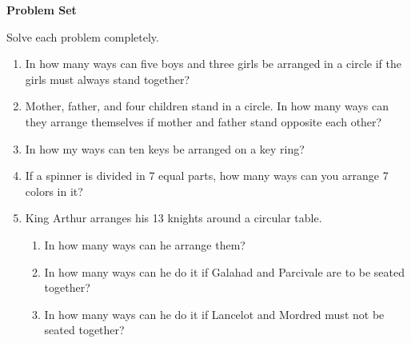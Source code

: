 \textbf{Problem Set}

\vspce

Solve each problem completely. 

\begin{enumerate}[label = \arabic*. ]
\item In how many ways can five boys and three girls be arranged in a circle if the girls must always stand together?

\item Mother, father, and four children stand in a circle. In how many ways can they arrange themselves if mother and father stand opposite each other?
\item In how my ways can ten keys be arranged on a key ring?
\item If a spinner is divided in 7 equal parts, how many ways can you arrange 7 colors in it?
\item King Arthur arranges his 13 knights around a circular table. 

\begin{enumerate}[label = \alph*. ]
\item In how many ways can he arrange them?
\item In how many ways can he do it if Galahad and Parcivale are to be seated together?
\item In how many ways can he do it if Lancelot and Mordred must not be seated together?
\end{enumerate}   

 

\end{enumerate} 



 

